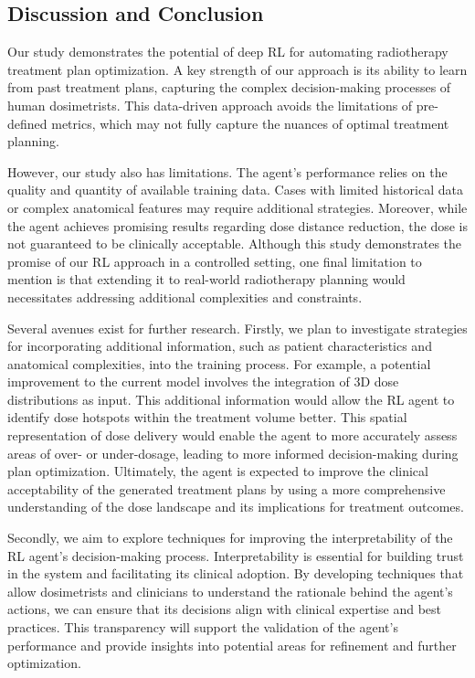 \subsection{Discussion and Conclusion}
Our study demonstrates the potential of deep RL for automating radiotherapy treatment plan optimization.
A key strength of our approach is its ability to learn from past treatment plans, capturing the complex decision-making processes of human dosimetrists.
This data-driven approach avoids the limitations of pre-defined metrics, which may not fully capture the nuances of optimal treatment planning.

However, our study also has limitations.
The agent's performance relies on the quality and quantity of available training data.
Cases with limited historical data or complex anatomical features may require additional strategies.
Moreover, while the agent achieves promising results regarding dose distance reduction, the dose is not guaranteed to be clinically acceptable.
Although this study demonstrates the promise of our RL approach in a controlled setting, one final limitation to mention is that extending it to real-world radiotherapy planning would necessitates addressing additional complexities and constraints.

Several avenues exist for further research.
Firstly, we plan to investigate strategies for incorporating additional information, such as patient characteristics and anatomical complexities, into the training process.
For example, a potential improvement to the current model involves the integration of 3D dose distributions as input.
This additional information would allow the RL agent to identify dose hotspots within the treatment volume better.
This spatial representation of dose delivery would enable the agent to more accurately assess areas of over- or under-dosage, leading to more informed decision-making during plan optimization.
Ultimately, the agent is expected to improve the clinical acceptability of the generated treatment plans by using a more comprehensive understanding of the dose landscape and its implications for treatment outcomes.

Secondly, we aim to explore techniques for improving the interpretability of the RL agent’s decision-making process.
Interpretability is essential for building trust in the system and facilitating its clinical adoption.
By developing techniques that allow dosimetrists and clinicians to understand the rationale behind the agent’s actions, we can ensure that its decisions align with clinical expertise and best practices.
This transparency will support the validation of the agent’s performance and provide insights into potential areas for refinement and further optimization.

